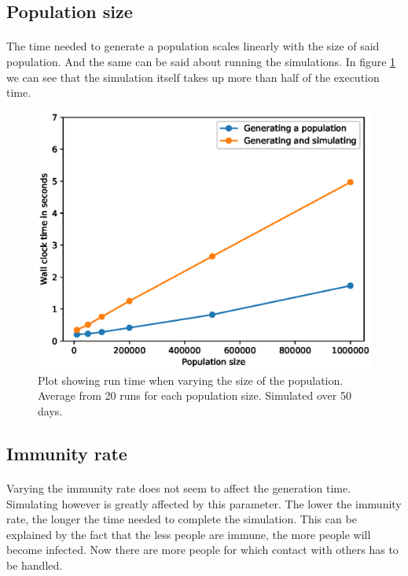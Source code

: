 \documentclass[runningheads]{llncs}
\begin{document}
\subsection{Population size}
\paragraph{} The time needed to generate a population scales linearly with the size of said population. And the same can be said about running the simulations. In figure \ref{Gprof_popsize} we can see that the simulation itself takes up more than half of the execution time.

\begin{figure}[h!]
	\centering
	\includegraphics[width=\textwidth]{3_Performance_Profiling/3_popsize.eps}
	\caption{Plot showing run time when varying the size of the population.
			Average from 20 runs for each population size. Simulated over 50 days.}
	\label{Gprof_popsize}
\end{figure}

\subsection{Immunity rate}
\paragraph{} Varying the immunity rate does not seem to affect the generation time.
Simulating however is greatly affected by this parameter. The lower the immunity rate, the longer the time needed to complete the simulation.
This can be explained by the fact that the less people are immune, the more people will become infected. Now there are more people for which contact with others has to be handled.
\end{document}
